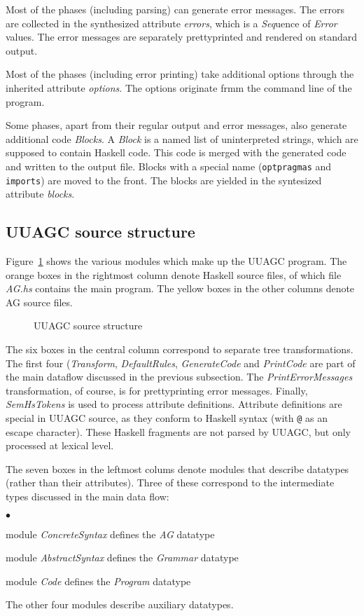 \documentclass[twoside]{article}
\newenvironment{itize}{\begin{list}{$\bullet$}{\parsep=0pt\parskip=0pt\topsep=0pt\itemsep=0pt}}{\end{list}}
\newcommand{\simplepicture}[2]{\centerline{\mbox{\texttt{[image: figs/\#2]}}}}
\begin{document}
Most of the phases (including parsing) can generate error messages.
The errors are collected in the synthesized attribute {\em errors},
which is a {\em Seq}uence of {\em Error} values.
The error messages are separately prettyprinted and rendered on standard output.

Most of the phases (including error printing) take additional options
through the inherited attribute {\em options}.
The options originate frmm the command line of the program.

Some phases, apart from their regular output and error messages, also generate additional code {\em Blocks}.
A {\em Block} is a named list of uninterpreted strings, which are supposed to contain Haskell code.
This code is merged with the generated code and written to the output file.
Blocks with a special name (\verb"optpragmas" and \verb"imports") are moved to the front.
The blocks are yielded in the syntesized attribute {\em blocks}.



\subsection{UUAGC source structure}

Figure~\ref{fig.uuagc-include} shows the various modules which make up the UUAGC program.
The orange boxes in the rightmost column denote Haskell source files,
of which file {\em AG.hs} contains the main program.
The yellow boxes in the other columns denote AG source files.
\begin{figure}[htbp]
\raisebox{0mm}{\simplepicture{0.5}{uuagc-include}}
\caption{UUAGC source structure}
\label{fig.uuagc-include}
\end{figure}

The six boxes in the central column correspond to separate tree transformations.
The first four ({\em Transform}, {\em DefaultRules}, {\em GenerateCode} and
{\em PrintCode} are part of the main dataflow discussed in the previous subsection.
The {\em PrintErrorMessages} transformation, of course, is for prettyprinting error messages.
Finally, {\em SemHsTokens} is used to process attribute definitions.
Attribute definitions are special in UUAGC source, as they conform to Haskell syntax
(with \verb"@" as an escape character). These Haskell fragments are not parsed by UUAGC,
but only processed at lexical level.

The seven boxes in the leftmost colums denote modules that describe datatypes
(rather than their attributes).
Three of these correspond to the intermediate types discussed in the main data flow:
\begin{itize}
\item module {\em ConcreteSyntax} defines the {\em AG} datatype
\item module {\em AbstractSyntax} defines the {\em Grammar} datatype
\item module {\em Code} defines the {\em Program} datatype
\end{itize}
The other four modules describe auxiliary datatypes.
\end{document}
